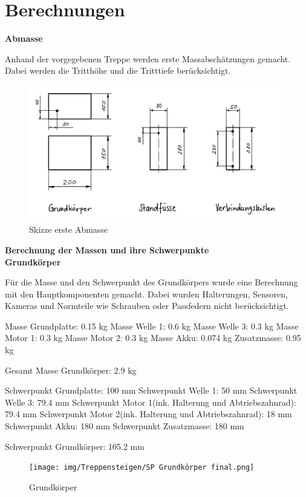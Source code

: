 \section*{Berechnungen}

\textbf{Abmasse}

Anhand der vorgegebenen Treppe werden erste Massabschätzungen gemacht. Dabei werden die Tritthöhe und die Tritttiefe berücksichtigt.

\begin{figure}[H]
  \includegraphics[width=1
  \textwidth]{img/Treppensteigen/Erste Abmasse}
  \centering
  \caption{Skizze erste Abmasse}
\end{figure}

\textbf{Berechnung der Massen und ihre Schwerpunkte}\\

\textbf{Grundkörper}

Für die Masse und den Schwerpunkt des Grundkörpers wurde eine Berechnung mit den Hauptkomponenten gemacht. Dabei wurden Halterungen, Sensoren, Kameras und Normteile wie Schrauben oder Passfedern nicht berücksichtigt.

Masse Grundplatte: 0.15 kg
Masse Welle 1: 0.6 kg
Masse Welle 3: 0.3 kg
Masse Motor 1: 0.3 kg
Masse Motor 2: 0.3 kg
Masse Akku: 0.074 kg
Zusatzmasse: 0.95 kg

Gesamt Masse Grundkörper: 2.9 kg

Schwerpunkt Grundplatte: 100 mm
Schwerpunkt Welle 1: 50 mm
Schwerpunkt Welle 3: 79.4 mm
Schwerpunkt Motor 1(ink. Halterung und Abtriebszahnrad): 79.4 mm
Schwerpunkt Motor 2(ink. Halterung und Abtriebszahnrad): 18 mm
Schwerpunkt Akku: 180 mm
Schwerpunkt Zusatzmasse: 180 mm

Schwerpunkt Grundkörper: 105.2 mm

\begin{figure}[H]
  \texttt{[image: img/Treppensteigen/SP Grundkörper final.png]}
  \centering
  \caption{Grundkörper}
\end{figure}

